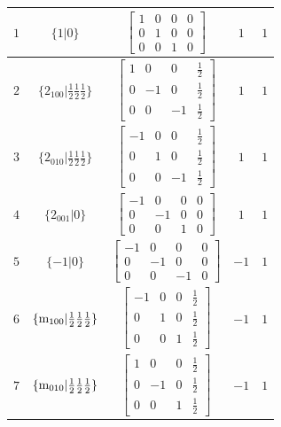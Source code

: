 \documentclass[fleqn,8pt]{jsarticle}
\begin{document}
\begin{longtable}{ccccc}
$ 1 $ & $ \{1|0\} $ & $ \begin{bmatrix} 1 & 0 & 0 & 0 \\ 0 & 1 & 0 & 0 \\ 0 & 0 & 1 & 0 \end{bmatrix} $ & $ 1 $ & $ 1 $ \\ \hline
$ 2 $ & $ \{2{}_{100}|\frac{1}{2} \frac{1}{2} \frac{1}{2}\} $ & $ \begin{bmatrix} 1 & 0 & 0 & \frac{1}{2} \\ 0 & -1 & 0 & \frac{1}{2} \\ 0 & 0 & -1 & \frac{1}{2} \end{bmatrix} $ & $ 1 $ & $ 1 $ \\ \hline
$ 3 $ & $ \{2{}_{010}|\frac{1}{2} \frac{1}{2} \frac{1}{2}\} $ & $ \begin{bmatrix} -1 & 0 & 0 & \frac{1}{2} \\ 0 & 1 & 0 & \frac{1}{2} \\ 0 & 0 & -1 & \frac{1}{2} \end{bmatrix} $ & $ 1 $ & $ 1 $ \\ \hline
$ 4 $ & $ \{2{}_{001}|0\} $ & $ \begin{bmatrix} -1 & 0 & 0 & 0 \\ 0 & -1 & 0 & 0 \\ 0 & 0 & 1 & 0 \end{bmatrix} $ & $ 1 $ & $ 1 $ \\ \hline
$ 5 $ & $ \{-1|0\} $ & $ \begin{bmatrix} -1 & 0 & 0 & 0 \\ 0 & -1 & 0 & 0 \\ 0 & 0 & -1 & 0 \end{bmatrix} $ & $ -1 $ & $ 1 $ \\ \hline
$ 6 $ & $ \{{\rm m}_{100}|\frac{1}{2} \frac{1}{2} \frac{1}{2}\} $ & $ \begin{bmatrix} -1 & 0 & 0 & \frac{1}{2} \\ 0 & 1 & 0 & \frac{1}{2} \\ 0 & 0 & 1 & \frac{1}{2} \end{bmatrix} $ & $ -1 $ & $ 1 $ \\ \hline
$ 7 $ & $ \{{\rm m}_{010}|\frac{1}{2} \frac{1}{2} \frac{1}{2}\} $ & $ \begin{bmatrix} 1 & 0 & 0 & \frac{1}{2} \\ 0 & -1 & 0 & \frac{1}{2} \\ 0 & 0 & 1 & \frac{1}{2} \end{bmatrix} $ & $ -1 $ & $ 1 $ \\ \hline

\end{longtable}
\end{document}
